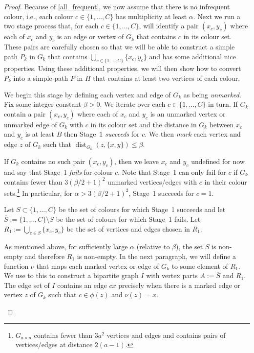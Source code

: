 \documentclass{patmorin}
\DeclareMathOperator{\dist}{dist}
\begin{document}
\begin{proof}
  Because of \cref{all_frequent}, we now assume that there is no infrequent colour, i.e., each colour $c\in\{1,\ldots,C\}$ has multiplicity at least $\alpha$.  Next we run a two stage process that, for each $c\in\{1,\ldots,C\}$, will identify a pair $(x_c,y_c)$ where each of $x_c$ and $y_c$ is an edge or vertex of $G_k$ that contains $c$ in its colour set.  These pairs are carefully chosen so that we will be able to construct a simple path $P_k$ in $G_k$ that contains $\bigcup_{c\in\{1,\ldots,C\}} \{x_c,y_c\}$ and has some additional nice properties.  Using these additional properties, we will then show how to convert $P_k$ into a simple path $P$ in $H$ that contains at least two vertices of each colour.

  \begin{compactenum}[{Stage} 1:]
    \item We begin this stage by defining each vertex and edge of $G_k$ as being \emph{unmarked}.  Fix some integer constant $\beta>0$.  We iterate over each $c\in\{1,\ldots,C\}$ in turn.  If $G_k$ contain a pair $(x_c,y_c)$ where each of $x_c$ and $y_c$ is an unmarked vertex or unmarked edge of $G_k$ with $c$ in its colour set and the distance in $G_k$ between $x_c$ and $y_c$ is at least $B$ then Stage~1 \emph{succeeds} for $c$.  We then \emph{mark} each vertex and edge $z$ of $G_k$ such that $\dist_{G_k}(z, \{x,y\})\le \beta$.

    If $G_k$ contains no such pair $(x_c,y_c)$, then we leave $x_c$ and $y_c$ undefined for now and say that Stage~1 \emph{fails} for colour $c$.  Note that Stage~1 can only fail for $c$ if $G_k$ contains fewer than $3(\beta/2+1)^2$ unmarked vertices/edges with $c$ in their colour sets.\footnote{$G_{a\times a}$ contains fewer than $3a^2$ vertices and edges and contains pairs of vertices/edges at distance $2(a-1)$.}  In particular, for $\alpha > 3(\beta/2+1)^2$, Stage~1 succeeds for $c=1$.

    \item Let $S\subset\{1,\ldots,C\}$ be the set of colours for which Stage~1 succeeds and let $\overline{S}:=\{1,\ldots,C\}\setminus S$ be the set of colours for which Stage~1 fails.  Let $R_1:=\bigcup_{c\in S}\{x_c,y_c\}$ be the set of vertices and edges chosen in $R_1$.

    As mentioned above, for sufficiently large $\alpha$ (relative to $\beta$), the set $S$ is non-empty and therefore $R_1$ is non-empty. In the next paragraph, we will define a function $\nu$ that maps each marked vertex or edge of $G_k$ to some element of $R_1$.  We use to this to construct a bipartite graph $I$ with vertex parts $A:=\overline{S}$ and $R_1$. The edge set of $I$ contains an edge $cx$ precisely when there is a marked edge or vertex $z$ of $G_k$ such that $c\in\phi(z)$ and $\nu(z)=x$.


\end{compactenum}
\end{proof}
\end{document}
